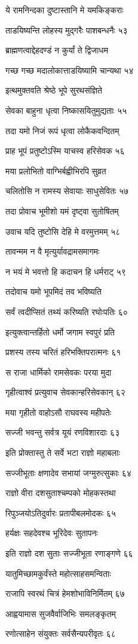 ये रामनिन्दका दुष्टास्तानि मे यमकिङ्कराः

ताडयिष्यन्ति लोहस्य मुद्गरैः पाशबन्धनैः ५३

ब्राह्मणत्वाद्देहदण्डं न कुर्यां ते द्विजाधम

गच्छ गच्छ मदालोकात्ताडयिष्यामि चान्यथा ५४

इत्थमुक्तवति श्रेष्ठे भूपे सुरथसंज्ञिते

सेवका बाहुना धृत्वा निष्कासयितुमुद्यताः ५५

तदा यमो निजं रूपं धृत्वा लोकैकवन्दितम्

प्राह भूपं प्रतुष्टोऽस्मि याचस्व हरिसेवक ५६

मया प्रलोभितो वाग्भिर्बह्वीभिरपि सुव्रत

चलितोसि न रामस्य सेवायाः साधुसेवितः ५७

तदा प्रोवाच भूमीशो यमं दृष्ट्वा सुतोषितम्

उवाच यदि तुष्टोसि देहि मे वरमुत्तमम् ५८

तावन्मम न वै मृत्युर्यावद्रामसमागमः

न भयं मे भवत्तो हि कदाचन हि धर्मराट् ५९

तदोवाच यमो भूपमिदं तव भविष्यति

सर्वं त्वदीप्सितं तथ्यं करिष्यति रघोःपतिः ६०

इत्युक्त्वान्तर्हितो धर्मो जगाम स्वपुरं प्रति

प्रशस्य तस्य चरितं हरिभक्तिपरात्मनः ६१

स राजा धार्मिको रामसेवकः परया मुदा

गृहीत्वाश्वं प्रत्युवाच सेवकान्हरिसेवकान् ६२

मया गृहीतो वाहोऽसौ राघवस्य महीपतेः

सज्जी भवन्तु सर्वत्र यूयं रणविशारदाः ६३

इति प्रोक्तास्तु ते सर्वे भटा राज्ञो महाबलाः

सज्जीभूताः क्षणादेव सभायां जग्मुरुत्सुकाः ६४

राज्ञो वीरा दशसुताश्चम्पको मोहकस्तथा

रिपुञ्जयोऽतिदुर्वारः प्रतापीबलमोदकः ६५

हर्यक्षः सहदेवश्च भूरिदेवः सुतापनः

इति राज्ञो दश सुताः सज्जीभूता रणाङ्गणे ६६

यातुमिच्छामकुर्वंस्ते महोत्साहसमन्विताः

राजापि स्वरथं चित्रं हेमशोभाविनिर्मितम् ६७

आह्वयामास सुजवैर्वाजिभिः समलङ्कृतम्

रणोत्साहेन संयुक्तः सर्वसैन्यपरीवृतः ६८

